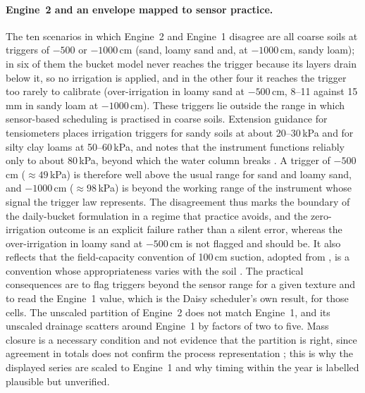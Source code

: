 \documentclass[preprint,12pt]{elsarticle}
\begin{document}
\paragraph{Engine~2 and an envelope mapped to sensor practice.} The ten scenarios in which Engine~2 and Engine~1 disagree are all coarse soils at triggers of $-500$ or $-1000$\,cm (sand, loamy sand and, at $-1000$\,cm, sandy loam); in six of them the bucket model never reaches the trigger because its layers drain below it, so no irrigation is applied, and in the other four it reaches the trigger too rarely to calibrate (over-irrigation in loamy sand at $-500$\,cm, 8--11 against 15\,mm in sandy loam at $-1000$\,cm). These triggers lie outside the range in which sensor-based scheduling is practised in coarse soils. Extension guidance for tensiometers places irrigation triggers for sandy soils at about 20--30\,kPa and for silty clay loams at 50--60\,kPa, and notes that the instrument functions reliably only to about 80\,kPa, beyond which the water column breaks \cite{Alam1997}. A trigger of $-500$\,cm ($\approx49$\,kPa) is therefore well above the usual range for sand and loamy sand, and $-1000$\,cm ($\approx98$\,kPa) is beyond the working range of the instrument whose signal the trigger law represents. The disagreement thus marks the boundary of the daily-bucket formulation in a regime that practice avoids, and the zero-irrigation outcome is an explicit failure rather than a silent error, whereas the over-irrigation in loamy sand at $-500$\,cm is not flagged and should be. It also reflects that the field-capacity convention of 100\,cm suction, adopted from \cite{Allen1998}, is a convention whose appropriateness varies with the soil \cite{Twarakavi2009,Assouline2014}. The practical consequences are to flag triggers beyond the sensor range for a given texture and to read the Engine~1 value, which is the Daisy scheduler's own result, for those cells. The unscaled partition of Engine~2 does not match Engine~1, and its unscaled drainage scatters around Engine~1 by factors of two to five. Mass closure is a necessary condition and not evidence that the partition is right, since agreement in totals does not confirm the process representation \cite{Oreskes1994}; this is why the displayed series are scaled to Engine~1 and why timing within the year is labelled plausible but unverified.
\end{document}
